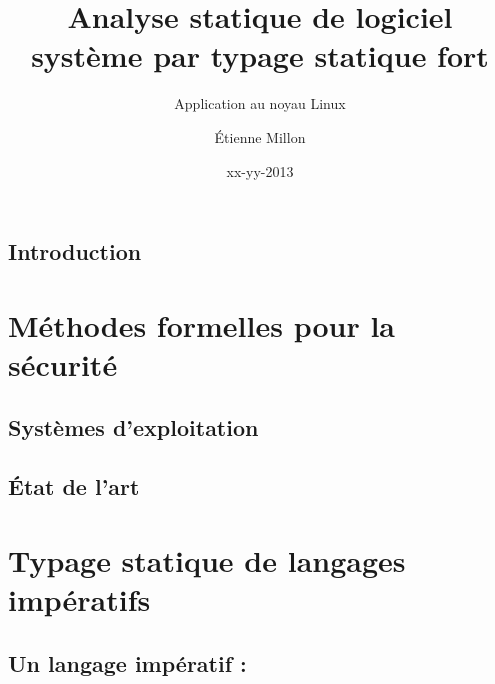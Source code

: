\documentclass[a4paper,11pt]{memoir}
\title{Analyse statique de logiciel système par typage statique fort}
\subtitle{Application au noyau Linux}
\author{Étienne Millon}
\date{xx-yy-2013}
\begin{document}
\frontmatter

\begin{titlingpage}
\titleUL{}
\end{titlingpage}

\cleartorecto

\asuabstract



\asuacknowledgements




\tableofcontents

\mainmatter

\chapter{Introduction}


\part{Méthodes formelles pour la sécurité}
\label{part:ctx}



\chapter{Systèmes d'exploitation}

\label{cha:os}



%

\chapter{État de l'art}



\part{Typage statique de langages impératifs}
\label{part:lang}



\chapter{Un langage impératif : \langname}
\end{document}
